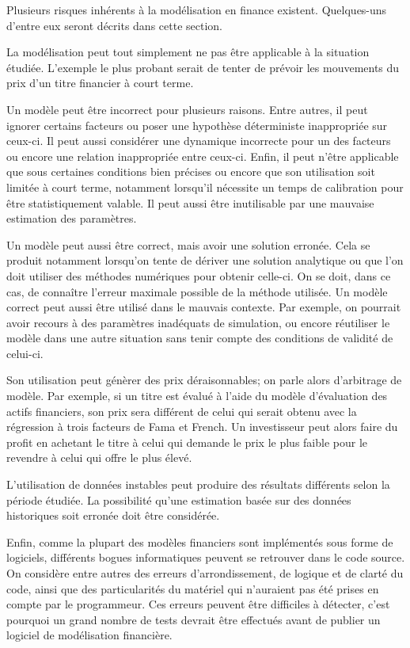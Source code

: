 Plusieurs risques inhérents à la modélisation en finance
existent. Quelques-uns d'entre eux seront décrits dans cette section.

La modélisation peut tout simplement ne pas être applicable à la
situation étudiée. L'exemple le plus probant serait de tenter de
prévoir les mouvements du prix d'un titre financier à court terme.

Un modèle peut être incorrect pour plusieurs raisons. Entre autres, il
peut ignorer certains facteurs ou poser une hypothèse déterministe
inappropriée sur ceux-ci. Il peut aussi considérer une dynamique
incorrecte pour un des facteurs ou encore une relation inappropriée
entre ceux-ci. Enfin, il peut n'être applicable que sous certaines
conditions bien précises ou encore que son utilisation soit limitée à
court terme, notamment lorsqu'il nécessite un temps de calibration
pour être statistiquement valable. Il peut aussi être inutilisable par
une mauvaise estimation des paramètres.

Un modèle peut aussi être correct, mais avoir une solution
erronée. Cela se produit notamment lorsqu'on tente de dériver une
solution analytique ou que l'on doit utiliser des méthodes numériques
pour obtenir celle-ci. On se doit, dans ce cas, de connaître l'erreur
maximale possible de la méthode utilisée. Un modèle correct peut aussi
être utilisé dans le mauvais contexte. Par exemple, on pourrait avoir
recours à des paramètres inadéquats de simulation, ou encore réutiliser le
modèle dans une autre situation sans tenir compte des
conditions de validité de celui-ci.

Son utilisation peut génèrer des prix déraisonnables; on parle alors
d'arbitrage de modèle. Par exemple, si un titre est évalué à l'aide du
modèle d'évaluation des actifs financiers, son prix sera différent de
celui qui serait obtenu avec la régression à trois facteurs de Fama et
French. Un investisseur peut alors faire du profit en achetant le
titre à celui qui demande le prix le plus faible pour le revendre à
celui qui offre le plus élevé.

L'utilisation de données instables peut produire des résultats
différents selon la période étudiée. La possibilité qu'une estimation
basée sur des données historiques soit erronée doit être considérée.

Enfin, comme la plupart des modèles financiers sont implémentés sous
forme de logiciels, différents bogues informatiques peuvent se
retrouver dans le code source. On considère entre autres des erreurs
d'arrondissement, de logique et de clarté du code, ainsi que des
particularités du matériel qui n'auraient pas été prises en compte par
le programmeur. Ces erreurs peuvent être difficiles à détecter, c'est
pourquoi un grand nombre de tests devrait être effectués avant de
publier un logiciel de modélisation financière.


